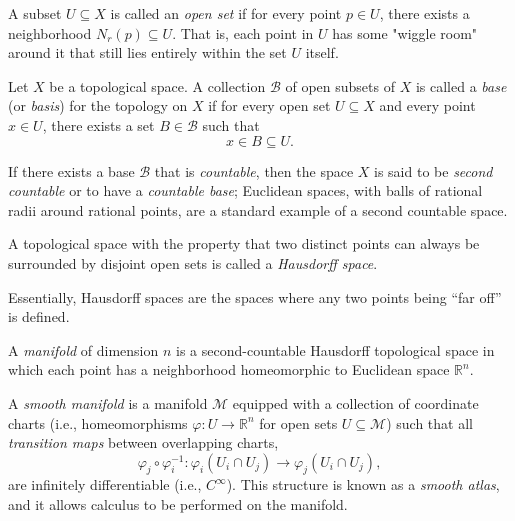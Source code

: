 \begin{definition}
A subset \( U \subseteq X \) is called an \emph{open set} if for every point \( p \in U \), there exists a neighborhood \( N_r(p) \subseteq U \). That is, each point in \( U \) has some "wiggle room" around it that still lies entirely within the set \( U \) itself.
\end{definition}

\begin{definition}
Let \( X \) be a topological space. A collection \( \mathcal{B} \) of open subsets of \( X \) is called a \emph{base} (or \emph{basis}) for the topology on \( X \) if for every open set \( U \subseteq X \) and every point \( x \in U \), there exists a set \( B \in \mathcal{B} \) such that
\[
x \in B \subseteq U.
\]

If there exists a base \( \mathcal{B} \) that is \emph{countable}, then the space \( X \) is said to be \emph{second countable} or to have a \emph{countable base}; Euclidean spaces, with balls of rational radii around rational points, are a standard example of a second countable space.
\end{definition}

\begin{definition}
A topological space with the property that two distinct points can always be surrounded by disjoint open sets is called a \emph{Hausdorff space}.
\end{definition}

Essentially, Hausdorff spaces are the spaces where any two points being ``far off'' is defined.

\begin{definition}[Manifold]
A \emph{manifold} of dimension \( n \) is a second-countable Hausdorff topological space in which each point has a neighborhood homeomorphic to Euclidean space \( \mathbb{R}^n \).
\end{definition}

\begin{definition}
A \emph{smooth manifold} is a manifold \( \mathcal{M} \) equipped with a collection of coordinate charts (i.e., homeomorphisms \( \varphi: U \to \mathbb{R}^n \) for open sets \( U \subseteq \mathcal{M} \)) such that all \emph{transition maps} between overlapping charts,
\[
\varphi_j \circ \varphi_i^{-1} : \varphi_i(U_i \cap U_j) \rightarrow \varphi_j(U_i \cap U_j),
\]
are infinitely differentiable (i.e., \( C^\infty \)). This structure is known as a \emph{smooth atlas}, and it allows calculus to be performed on the manifold.
\end{definition}

